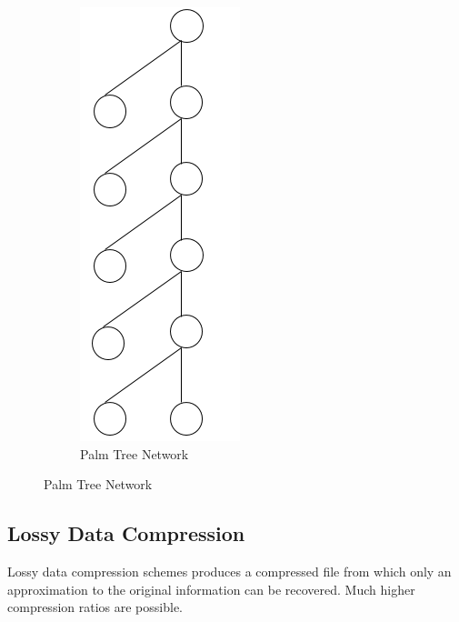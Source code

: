 \documentclass[%
  slidesonly,%
  semlayer%
  ]{seminar}                                  %
\begin{document}
\begin{slide}
\begin{figure}
        \begin{subfigure}
          \centering
          \includegraphics[scale=0.5]{images/pseudo-palm-tree.png}
          \caption{Palm Tree Network}
          \label{fig:palm-tree}
        \end{subfigure}%
      \end{figure}





      \clearpage

  \subsection*{Lossy Data Compression}
    Lossy data compression schemes produces a compressed file from which only an approximation to the original information can be recovered. Much higher compression ratios are possible.


\end{slide}
\end{document}
